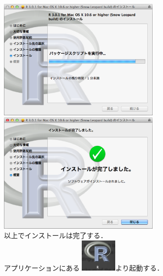 \documentclass[a4paper,10pt,fleqn]{jarticle}
\begin{document}
\includegraphics[width=8cm]{img/osx/osx010.eps}\hspace{0.8em} \includegraphics[width=8cm]{img/osx/osx011.eps}\\

以上でインストールは完了する．\\

アプリケーションにある \includegraphics[width=1.8cm]{img/osx/osx012.eps}より起動する．
\end{document}
